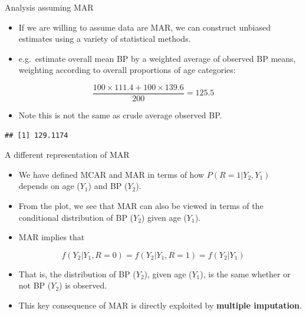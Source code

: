 \documentclass[ignorenonframetext,]{beamer}
\newenvironment{Shaded}{\begin{snugshade}}{\end{snugshade}}
\newcommand{\DataTypeTok}[1]{\textcolor[rgb]{0.13,0.29,0.53}{#1}}
\newcommand{\KeywordTok}[1]{\textcolor[rgb]{0.13,0.29,0.53}{\textbf{#1}}}
\newcommand{\NormalTok}[1]{#1}
\newcommand{\OperatorTok}[1]{\textcolor[rgb]{0.81,0.36,0.00}{\textbf{#1}}}
\newcommand{\OtherTok}[1]{\textcolor[rgb]{0.56,0.35,0.01}{#1}}
\providecommand{\tightlist}{%
  \setlength{\itemsep}{0pt}\setlength{\parskip}{0pt}}
\begin{document}
\begin{frame}[fragile]{Analysis assuming MAR}
\protect\hypertarget{analysis-assuming-mar}{}

\begin{itemize}
\tightlist
\item
  If we are willing to assume data are MAR, we can construct unbiased
  estimates using a variety of statistical methods.
\item
  e.g.~estimate overall mean BP by a weighted average of observed BP
  means, weighting according to overall proportions of age categories:
\end{itemize}

\[  \frac{100 \times 111.4 + 100 \times 139.6}{200} = 125.5  \]

\begin{itemize}
\tightlist
\item
  Note this is not the same as crude average observed BP.
\end{itemize}

\small

\begin{Shaded}
\end{Shaded}

\begin{verbatim}
## [1] 129.1174
\end{verbatim}

\normalsize

\end{frame}

\begin{frame}{A different representation of MAR}
\protect\hypertarget{a-different-representation-of-mar}{}

\begin{itemize}
\tightlist
\item
  We have defined MCAR and MAR in terms of how \(P(R=1|Y_{2},Y_{1})\)
  depends on age (\(Y_{1}\)) and BP (\(Y_{2}\)).
\item
  From the plot, we see that MAR can also be viewed in terms of the
  conditional distribution of BP (\(Y_{2}\)) given age (\(Y_{1}\)).
\item
  MAR implies that
\end{itemize}

\[  f(Y_{2}|Y_{1},R=0)=f(Y_{2}|Y_{1},R=1)=f(Y_{2}|Y_{1})\]

\begin{itemize}
\tightlist
\item
  That is, the distribution of BP (\(Y_{2}\)), given age (\(Y_{1}\)), is
  the same whether or not BP (\(Y_{2}\)) is observed.
\item
  This key consequence of MAR is directly exploited by \textbf{multiple
  imputation}.
\end{itemize}

\end{frame}
\end{document}
